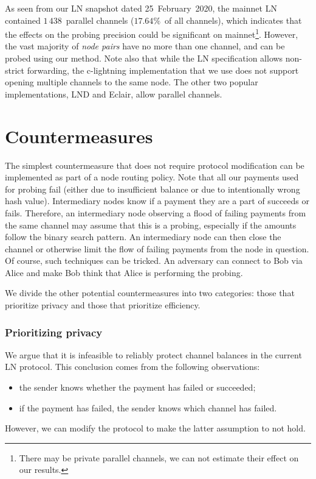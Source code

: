 As seen from our LN snapshot dated 25~February~2020, the mainnet LN contained $1\,438$~parallel channels ($17.64\%$~of all channels), which indicates that the effects on the probing precision could be significant on mainnet\footnote{There may be private parallel channels, we can not estimate their effect on our results.}.
However, the vast majority of \textit{node pairs} have no more than one channel, and can be probed using our method.
Note also that while the LN specification allows non-strict forwarding, the c-lightning implementation that we use does not support opening multiple channels to the same node.
The other two popular implementations, LND and Eclair, allow parallel channels.


\section{Countermeasures}

The simplest countermeasure that does not require protocol modification can be implemented as part of a node routing policy.
Note that all our payments used for probing fail (either due to insufficient balance or due to intentionally wrong hash value). 
Intermediary nodes know if a payment they are a part of succeeds or fails.
Therefore, an intermediary node observing a flood of failing payments from the same channel may assume that this is a probing, especially if the amounts follow the binary search pattern.
An intermediary node can then close the channel or otherwise limit the flow of failing payments from the node in question.
Of course, such techniques can be tricked.
An adversary can connect to Bob via Alice and make Bob think that Alice is performing the probing.

We divide the other potential countermeasures into two categories: those that prioritize privacy and those that prioritize efficiency.


\subsubsection*{Prioritizing privacy}

We argue that it is infeasible to reliably protect channel balances in the current LN protocol.
This conclusion comes from the following observations:
\begin{itemize}
	\item the sender knows whether the payment has failed or succeeded;
	\item if the payment has failed, the sender knows which channel has failed.
\end{itemize}
However, we can modify the protocol to make the latter assumption to not hold.


